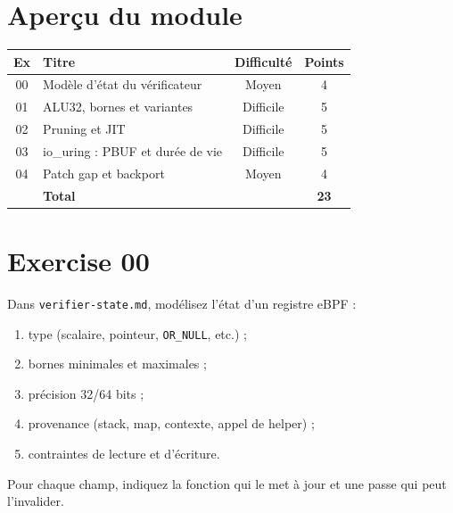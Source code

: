 \documentclass{training}
\begin{document}
\chapter{Aperçu du module}

\begin{center}
\begin{tabularx}{\linewidth}{|c|l|c|c|}
\hline
\textbf{Ex} & \textbf{Titre} & \textbf{Difficulté} & \textbf{Points} \\ \hline
00 & Modèle d'état du vérificateur & Moyen & 4 \\
01 & ALU32, bornes et variantes & Difficile & 5 \\
02 & Pruning et JIT & Difficile & 5 \\
03 & io\_uring : PBUF et durée de vie & Difficile & 5 \\
04 & Patch gap et backport & Moyen & 4 \\ \hline
& \textbf{Total} & & \textbf{23} \\ \hline
\end{tabularx}
\end{center}

\startexercices

\chapter{Exercise 00}
\makeheaderfiles

Dans \texttt{verifier-state.md}, modélisez l'état d'un registre eBPF :

\begin{enumerate}
  \item type (scalaire, pointeur, \texttt{OR\_NULL}, etc.) ;
  \item bornes minimales et maximales ;
  \item précision 32/64 bits ;
  \item provenance (stack, map, contexte, appel de helper) ;
  \item contraintes de lecture et d'écriture.
\end{enumerate}

Pour chaque champ, indiquez la fonction qui le met à jour et une passe qui
peut l'invalider.

\end{document}
